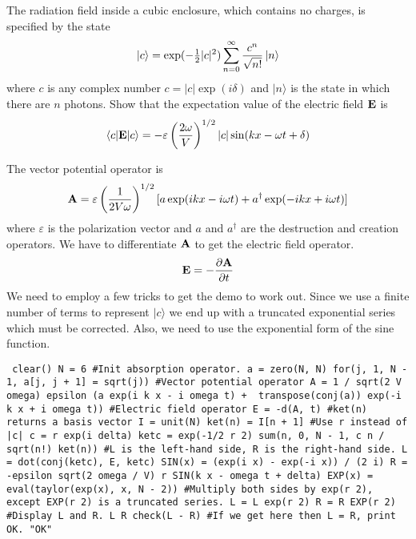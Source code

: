 
The radiation field inside a cubic enclosure, which contains no charges,
is specified by the state
$$|c\rangle=\exp(-\hbox{$1\over2$}|c|^2)\sum_{n=0}^\infty
{c^n\over\sqrt{n!}}\,|n\rangle$$
where $c$ is any complex number $c=|c|\exp(i\delta)$
and $|n\rangle$ is the state in which
there are $n$ photons.
Show that the expectation value of the electric field $\bf E$ is
$$\langle c|{\bf E}|c\rangle=-\varepsilon
\left({2\omega\over V}\right)^{1/2}|c|\sin(kx-\omega t+\delta)$$


The vector potential operator is
$${\bf A}=\varepsilon\left({1\over2V\omega}\right)^{1/2}
[a\exp(ikx-i\omega t)+a^\dagger\exp(-ikx+i\omega t)]$$
where $\varepsilon$ is the polarization vector and $a$ and $a^\dagger$
are the destruction and creation operators.
We have to differentiate $\bf A$ to get the electric field operator.
$${\bf E}=-{\partial {\bf A}\over\partial t}$$
We need to employ a few tricks to get the demo to work out.
Since we use a finite number of terms to represent
$|c\rangle$ we end up with a truncated exponential series
which must be corrected.
Also, we need to use the exponential form of the sine function.

\vfill
\break

{\tt\obeylines
clear()
N = 6
\#Init absorption operator.
a = zero(N, N)
for(j, 1, N - 1, a[j, j + 1] = sqrt(j))
\#Vector potential operator
A = 1 / sqrt(2 V omega) epsilon (a exp(i k x - i omega t) +
\ transpose(conj(a)) exp(-i k x + i omega t))
\#Electric field operator
E = -d(A, t)
\#ket(n) returns a basis vector
I = unit(N)
ket(n) = I[n + 1]
\#Use r instead of |c|
c = r exp(i delta)
ketc = exp(-1/2 r 2) sum(n, 0, N - 1, c n / sqrt(n!)~ket(n))
\#L is the left-hand side, R is the right-hand side.
L = dot(conj(ketc), E, ketc)
SIN(x) = (exp(i x) - exp(-i x)) / (2 i)
R = -epsilon sqrt(2 omega / V) r SIN(k x - omega t + delta)
EXP(x) = eval(taylor(exp(x), x, N - 2))
\#Multiply both sides by exp(r 2), except EXP(r 2) is a truncated series.
L = L exp(r 2)
R = R EXP(r 2)
\#Display L and R.
L
R
check(L - R)
\#If we get here then L = R, print OK.
"OK"

}

